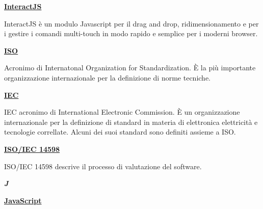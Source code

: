\bigskip
\begin{addmargin}[0em]{0em}		
	\textbf{\underline{InteractJS}}
\end{addmargin}

\medskip
\begin{addmargin}[5em]{1em}	
InteractJS è un modulo Javascript per il drag and drop, ridimensionamento e per i gestire i comandi multi-touch in modo rapido e semplice per i moderni browser.
\end{addmargin}

\bigskip
\begin{addmargin}[0em]{0em}
	\textbf{\underline{ISO}}
\end{addmargin}
	
\medskip
\begin{addmargin}[5em]{1em}	
Acronimo di Internatonal Organization for Standardization. È la più importante organizzazione internazionale per la definizione di norme tecniche. 
\end{addmargin}

\bigskip
\begin{addmargin}[0em]{0em}
	\textbf{\underline{IEC}}
\end{addmargin}
	
\medskip
\begin{addmargin}[5em]{1em}	
IEC acronimo di International Electronic Commission. È un organizzazione internazionale per la definizione di standard in materia di elettronica elettricità e tecnologie correllate. Alcuni dei suoi standard sono definiti assieme a ISO.
\end{addmargin}	

\bigskip
\begin{addmargin}[0em]{0em}
	\textbf{\underline{ISO/IEC 14598}}
\end{addmargin}
	
\medskip
\begin{addmargin}[5em]{1em}	
ISO/IEC 14598 descrive il processo di valutazione del software.  
\end{addmargin}	

\newpage

\cleardoublepage
{}
{}
\noindent\hrulefill\hspace{4mm}\textbf{\textsl{\Huge{J}}}\hspace{4mm}\hrulefill

\vspace*{2\bigskipamount}

\begin{addmargin}[0em]{0em}	
	\textbf{\underline{JavaScript}}
\end{addmargin}

